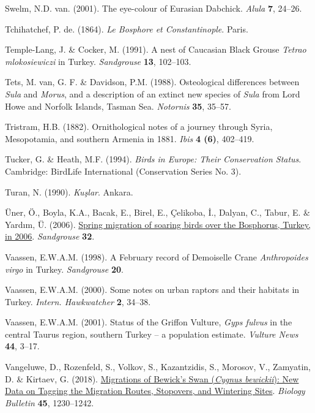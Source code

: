 \documentclass[
  a4paper,
  DIV=11,
  numbers=noendperiod]{scrreprt}
\newlength{\cslhangindent}
\newenvironment{CSLReferences}[2] %
 {\begin{list}{}{%
  \setlength{\itemindent}{0pt}
  \setlength{\leftmargin}{0pt}
  \setlength{\parsep}{0pt}
  \ifodd #1
   \setlength{\leftmargin}{\cslhangindent}
   \setlength{\itemindent}{-1\cslhangindent}
  \fi
  \setlength{\itemsep}{#2\baselineskip}}}
 {\end{list}}
\begin{document}
\begin{CSLReferences}{1}{1}
Swelm, N.D. van. (2001). {The eye-colour of Eurasian Dabchick}.
\emph{Alula} \textbf{7}, 24--26.

Tchihatchef, P. de. (1864). \emph{{Le Bosphore et Constantinople}}.
Paris.

Temple-Lang, J. \& Cocker, M. (1991). {A nest of Caucasian Black Grouse
\emph{Tetrao mlokosiewiczi} in Turkey}. \emph{Sandgrouse} \textbf{13},
102--103.

Tets, M. van, G. F. \& Davidson, P.M. (1988). {Osteological differences
between \emph{Sula} and \emph{Morus}, and a description of an extinct
new species of \emph{Sula} from Lord Howe and Norfolk Islands, Tasman
Sea}. \emph{Notornis} \textbf{35}, 35--57.

Tristram, H.B. (1882). {Ornithological notes of a journey through Syria,
Mesopotamia, and southern Armenia in 1881}. \emph{Ibis} \textbf{4 (6)},
402--419.

Tucker, G. \& Heath, M.F. (1994). \emph{{Birds in Europe: Their
Conservation Status}}. Cambridge: BirdLife International (Conservation
Series No. 3).

Turan, N. (1990). \emph{{Kuşlar}}. Ankara.

Üner, Ö., Boyla, K.A., Bacak, E., Birel, E., Çelikoba, İ., Dalyan, C.,
Tabur, E. \& Yardım, Ü. (2006).
\href{https://osme.org/sandgrouse/}{{Spring migration of soaring birds
over the Bosphorus, Turkey, in 2006}}. \emph{Sandgrouse} \textbf{32}.

Vaassen, E.W.A.M. (1998). {A February record of Demoiselle Crane
\emph{Anthropoides virgo} in Turkey}. \emph{Sandgrouse} \textbf{20}.

Vaassen, E.W.A.M. (2000). {Some notes on urban raptors and their
habitats in Turkey}. \emph{Intern. Hawkwatcher} \textbf{2}, 34--38.

Vaassen, E.W.A.M. (2001). {Status of the Griffon Vulture, \emph{Gyps
fulvus} in the central Taurus region, southern Turkey -- a population
estimate}. \emph{Vulture News} \textbf{44}, 3--17.

Vangeluwe, D., Rozenfeld, S., Volkov, S., Kazantzidis, S., Morosov, V.,
Zamyatin, D. \& Kirtaev, G. (2018).
\href{https://doi.org/10.1134/S1062359018070178}{{Migrations of Bewick's
Swan (\emph{Cygnus bewickii}): New Data on Tagging the Migration Routes,
Stopovers, and Wintering Sites}}. \emph{Biology Bulletin} \textbf{45},
1230--1242.


\end{CSLReferences}
\end{document}
